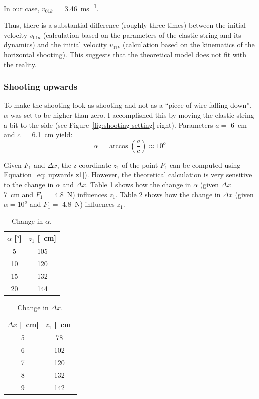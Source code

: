 			In our case, $ v_{01k} = $ \SI{3.46}{ms^{-1}}.
			
			Thus, there is a substantial difference (roughly three times) between the initial velocity $v_{01d}$ (calculation based on the parameters of the elastic string and its dynamics) and the initial velocity $v_{01k}$ (calculation based on the kinematics of the horizontal shooting). This suggests that the theoretical model does not fit with the reality.
			
		\subsubsection{Shooting upwards}
			To make the shooting look as shooting and not as a ``piece of wire falling down'', $ \alpha$ was set to be higher than zero. I accomplished this by moving the elastic string a bit to the side (see Figure~\ref{fig:shooting setting} right). Parameters $ a = $ \SI{6}{cm} and $ c = $ \SI{6.1}{cm} yield:
			\begin{equation}
				\alpha = \arccos \left(\frac{a}{c} \right) \approx 10^{o}
			\end{equation}
			
			Given $ F_1$ and $ \Delta x$, the z-coordinate $ z_1$ of the point $ P_1$ can be computed using Equation~\eqref{eq: upwards z1}). However, the theoretical calculation is very sensitive to the change in $ \alpha$ and $ \Delta x$. Table \ref{table: change in alpha} shows how the change in $ \alpha$ (given $\Delta x = $ \SI{7}{cm} and $F_1 = $ \SI{4.8}{N}) influences $z_1$. Table \ref{table: change in dx} shows how the change in $ \Delta x$ (given $ \alpha = 10^{o}$ and $F_1 = $ \SI{4.8}{N}) influences $z_1$.

			\begin{table}\centering
			\begin{tabular}{@{}cc@{}}\toprule
			$\alpha$ [$^{o}$] & $ z_1$ [\SI{}{cm}] \\ \midrule
			
			5  & 105 \\
			10 & 120 \\
			15 & 132 \\
			20 & 144 \\
			 \bottomrule
			\end{tabular}
			\caption{Change in $\alpha$.}
			\label{table: change in alpha}
			\end{table}
			
			\begin{table}\centering
			\begin{tabular}{@{}cc@{}}\toprule
			$\Delta x$ [\SI{}{cm}] & $ z_1$ [\SI{}{cm}] \\ \midrule
			
			5 & 78 \\
			6 & 102 \\
			7 & 120 \\
			8 & 132 \\
			9 & 142 \\
			\bottomrule
			\end{tabular}
			\caption{Change in $ \Delta x$.}
			\label{table: change in dx}
			\end{table}
			
